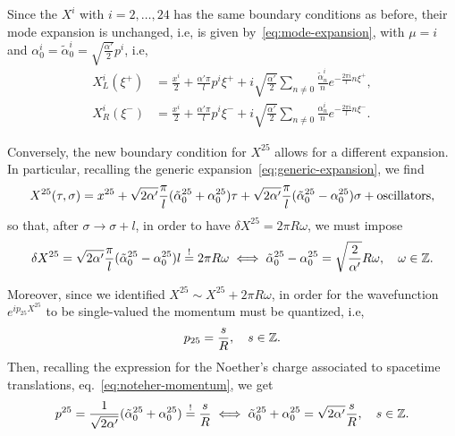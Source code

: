 Since the $X^i$ with $i= 2, \dots, 24$ has the same boundary conditions as before, their mode expansion is unchanged, i.e, is given by~\eqref{eq:mode-expansion}, with $\mu = i$ and $\alpha^i_0 = \tilde{\alpha}^i_0 = \sqrt{\frac{\alpha'}{2}}p^i$, i.e,
\begin{subequations}\label{eq:lightcone-mode-decomposition}
\begin{align}
    X^i_L(\xi^+) &= \frac{x^i}{2} + \frac{\alpha'\pi}{l} p^i \xi^+ + i \sqrt{\frac{\alpha'}{2}} \sum_{n\neq 0} \frac{\tilde{\alpha}^i_n}{n}e^{-\frac{2\pi i}{l}n \xi^+}, \\
    X^i_R(\xi^-) &= \frac{x^i}{2} + \frac{\alpha'\pi}{l} p^i \xi^- + i \sqrt{\frac{\alpha'}{2}} \sum_{n\neq 0} \frac{{\alpha}^i_n}{n}e^{-\frac{2\pi i}{l}n \xi^-} .
\end{align}
\end{subequations}

Conversely, the new boundary condition for $X^{25}$ allows for a different expansion. In particular, recalling the generic expansion~\eqref{eq:generic-expansion}, we find
\begin{equation}
    X^{25} (\tau,\sigma) = x^{25} + \sqrt{2\alpha'} \frac{\pi}{l} (\tilde{\alpha}^{25}_0 + \alpha^{25}_0) \tau + \sqrt{2\alpha'} \frac{\pi}{l} (\tilde{\alpha}^{25}_0 - \alpha^{25}_0) \sigma + \textup{oscillators},
\end{equation}
so that, after $\sigma \to \sigma + l$, in order to have $\delta X^{25} = 2\pi R \omega$, we must impose
\begin{equation}\label{eq:equation1}
    \delta X^{25} = \sqrt{2\alpha'} \frac{\pi}{l} (\tilde{\alpha}^{25}_0 - \alpha^{25}_0) l \overset{\mathrm{!}}{=} 2 \pi R \omega \iff \tilde{\alpha}^{25}_0 - \alpha^{25}_0 = \sqrt{\frac{2}{\alpha'}} R \omega, \quad \omega \in \mathbb{Z}.
\end{equation}

Moreover, since we identified $X^{25} \sim X^{25} + 2 \pi R \omega$, in order for the wavefunction $e^{ip_{25}X^{25}}$ to be single-valued the momentum must be quantized, i.e,
\begin{equation}
    p_{25} = \frac{s}{R}, \quad s \in \mathbb{Z}.
\end{equation}
Then, recalling the expression for the Noether's charge associated to spacetime translations, eq.~\eqref{eq:noteher-momentum}, we get
\begin{equation}\label{eq:equation2}
    p^{25} = \frac{1}{\sqrt{2\alpha'}}(\tilde{\alpha}^{25}_0 + \alpha^{25}_0) \overset{\mathrm{!}}{=} \frac{s}{R} \iff \tilde{\alpha}^{25}_0 + \alpha^{25}_0 = \sqrt{2\alpha'} \frac{s}{R}, \quad s \in \mathbb{Z}.
\end{equation}


